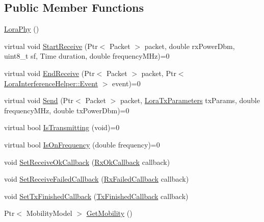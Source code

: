 \subsection*{Public Member Functions}
\begin{DoxyCompactItemize}
\item 
\hyperlink{classns3_1_1lorawan_1_1LoraPhy_ae7fcfd340ea8fcf49e32d02df39555be}{Lora\+Phy} ()
\item 
virtual void \hyperlink{classns3_1_1lorawan_1_1LoraPhy_aeeccb517d12084e12e36b533db22386b}{Start\+Receive} (Ptr$<$ Packet $>$ packet, double rx\+Power\+Dbm, uint8\+\_\+t sf, Time duration, double frequency\+M\+Hz)=0
\item 
virtual void \hyperlink{classns3_1_1lorawan_1_1LoraPhy_a719f749890c247abc3fda290d384c37f}{End\+Receive} (Ptr$<$ Packet $>$ packet, Ptr$<$ \hyperlink{classns3_1_1lorawan_1_1LoraInterferenceHelper_1_1Event}{Lora\+Interference\+Helper\+::\+Event} $>$ event)=0
\item 
virtual void \hyperlink{classns3_1_1lorawan_1_1LoraPhy_a2b940beff4a2fbfb2e603d5d9e65d863}{Send} (Ptr$<$ Packet $>$ packet, \hyperlink{structns3_1_1lorawan_1_1LoraTxParameters}{Lora\+Tx\+Parameters} tx\+Params, double frequency\+M\+Hz, double tx\+Power\+Dbm)=0
\item 
virtual bool \hyperlink{classns3_1_1lorawan_1_1LoraPhy_a5280764d934ba5ff8d305b0bc6b600ce}{Is\+Transmitting} (void)=0
\item 
virtual bool \hyperlink{classns3_1_1lorawan_1_1LoraPhy_a554597e30a17b099e8a7f68242cb16a7}{Is\+On\+Frequency} (double frequency)=0
\item 
void \hyperlink{classns3_1_1lorawan_1_1LoraPhy_a2887a339fd5c66dc509a934d42f188c5}{Set\+Receive\+Ok\+Callback} (\hyperlink{classns3_1_1lorawan_1_1LoraPhy_ae9342f40d4eb2b1f004309f6fb444a50}{Rx\+Ok\+Callback} callback)
\item 
void \hyperlink{classns3_1_1lorawan_1_1LoraPhy_a728d263724c20bb591247a4cb5b2641a}{Set\+Receive\+Failed\+Callback} (\hyperlink{classns3_1_1lorawan_1_1LoraPhy_a2229a4841f407ee9931e563622edf663}{Rx\+Failed\+Callback} callback)
\item 
void \hyperlink{classns3_1_1lorawan_1_1LoraPhy_aed62597e93fd17ccb4cb36d637a41728}{Set\+Tx\+Finished\+Callback} (\hyperlink{classns3_1_1lorawan_1_1LoraPhy_a3dd8f8ea5717fc775dde00ad54f5402c}{Tx\+Finished\+Callback} callback)
\item 
Ptr$<$ Mobility\+Model $>$ \hyperlink{classns3_1_1lorawan_1_1LoraPhy_adc4767610ff2a4b7b55dc49d2adf6a2f}{Get\+Mobility} ()
\item 

\end{DoxyCompactItemize}
